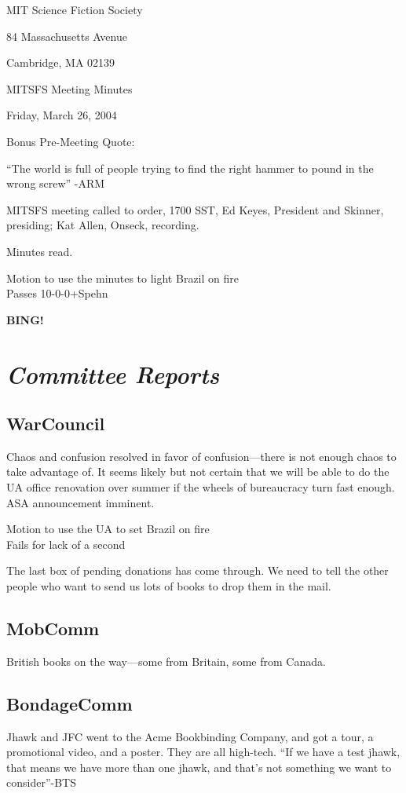 \documentclass[10pt]{article}
\newcommand{\bing}{{\bf BING!} }
\newcommand{\goto}[1]{\bing \vskip 12pt \section*{{\em{#1}}}}
\begin{document}
\begin{center}

MIT Science Fiction Society 

84 Massachusetts Avenue

Cambridge, MA 02139

\vspace{12pt}

MITSFS Meeting Minutes 

Friday, March 26, 2004

\end{center}
 
\vspace{18pt}

\setlength{\parskip}{6pt}

\noindent
Bonus Pre-Meeting Quote:

``The world is full of people trying to find the right hammer to pound
in the wrong screw'' -ARM

MITSFS meeting called to order, 1700 SST, Ed Keyes, President and
Skinner, presiding; Kat Allen,  Onseck, recording.

Minutes read.

Motion to use the minutes to light Brazil on fire\\
Passes 10-0-0+Spehn

\goto{Committee Reports}
\subsection*{WarCouncil}
Chaos and confusion resolved in favor of confusion---there is not
enough chaos to take advantage of. It seems likely but not certain
that we will be able to do the UA office renovation over summer if the
wheels of bureaucracy turn fast enough. ASA announcement imminent.

Motion to use the UA to set Brazil on fire \\
Fails for lack of a second

The last box of pending donations has come through. We need to tell
the other people who want to send us lots of books to drop them in the mail.

\subsection*{MobComm}
British books on the way---some from Britain, some from Canada.

\subsection*{BondageComm}
Jhawk and JFC went to the Acme Bookbinding Company, and got a tour, a
promotional video, and a poster. They are all high-tech.  ``If we have
a test jhawk, that means we have more than one jhawk, and that's not
something we want to consider''-BTS
\end{document}
